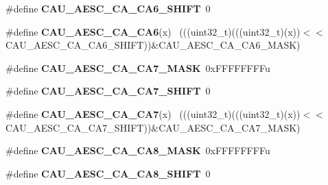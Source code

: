 \begin{DoxyCompactItemize}
\item 
\hypertarget{group___c_a_u___register___masks_gaa8448e0d27851e9f7c9277c78b46909f}{}\#define {\bfseries C\+A\+U\+\_\+\+A\+E\+S\+C\+\_\+\+C\+A\+\_\+\+C\+A6\+\_\+\+S\+H\+I\+F\+T}~0\label{group___c_a_u___register___masks_gaa8448e0d27851e9f7c9277c78b46909f}

\item 
\hypertarget{group___c_a_u___register___masks_ga6980b78417b9dc96778706bfc75820b6}{}\#define {\bfseries C\+A\+U\+\_\+\+A\+E\+S\+C\+\_\+\+C\+A\+\_\+\+C\+A6}(x)                                          ~(((uint32\+\_\+t)(((uint32\+\_\+t)(x))$<$$<$C\+A\+U\+\_\+\+A\+E\+S\+C\+\_\+\+C\+A\+\_\+\+C\+A6\+\_\+\+S\+H\+I\+F\+T))\&C\+A\+U\+\_\+\+A\+E\+S\+C\+\_\+\+C\+A\+\_\+\+C\+A6\+\_\+\+M\+A\+S\+K)\label{group___c_a_u___register___masks_ga6980b78417b9dc96778706bfc75820b6}

\item 
\hypertarget{group___c_a_u___register___masks_ga52597534749f65beb43a15fc74aafb0e}{}\#define {\bfseries C\+A\+U\+\_\+\+A\+E\+S\+C\+\_\+\+C\+A\+\_\+\+C\+A7\+\_\+\+M\+A\+S\+K}~0x\+F\+F\+F\+F\+F\+F\+F\+Fu\label{group___c_a_u___register___masks_ga52597534749f65beb43a15fc74aafb0e}

\item 
\hypertarget{group___c_a_u___register___masks_gaf1760cda5d2b0930cef17ec6966d81c1}{}\#define {\bfseries C\+A\+U\+\_\+\+A\+E\+S\+C\+\_\+\+C\+A\+\_\+\+C\+A7\+\_\+\+S\+H\+I\+F\+T}~0\label{group___c_a_u___register___masks_gaf1760cda5d2b0930cef17ec6966d81c1}

\item 
\hypertarget{group___c_a_u___register___masks_gabeced67c3c234d638e67bb3fd5b45122}{}\#define {\bfseries C\+A\+U\+\_\+\+A\+E\+S\+C\+\_\+\+C\+A\+\_\+\+C\+A7}(x)                                          ~(((uint32\+\_\+t)(((uint32\+\_\+t)(x))$<$$<$C\+A\+U\+\_\+\+A\+E\+S\+C\+\_\+\+C\+A\+\_\+\+C\+A7\+\_\+\+S\+H\+I\+F\+T))\&C\+A\+U\+\_\+\+A\+E\+S\+C\+\_\+\+C\+A\+\_\+\+C\+A7\+\_\+\+M\+A\+S\+K)\label{group___c_a_u___register___masks_gabeced67c3c234d638e67bb3fd5b45122}

\item 
\hypertarget{group___c_a_u___register___masks_ga7d4416b298869da3e7c79f6a3443f015}{}\#define {\bfseries C\+A\+U\+\_\+\+A\+E\+S\+C\+\_\+\+C\+A\+\_\+\+C\+A8\+\_\+\+M\+A\+S\+K}~0x\+F\+F\+F\+F\+F\+F\+F\+Fu\label{group___c_a_u___register___masks_ga7d4416b298869da3e7c79f6a3443f015}

\item 
\hypertarget{group___c_a_u___register___masks_ga6498c3198edfe7b02dee8cb187511abb}{}\#define {\bfseries C\+A\+U\+\_\+\+A\+E\+S\+C\+\_\+\+C\+A\+\_\+\+C\+A8\+\_\+\+S\+H\+I\+F\+T}~0\label{group___c_a_u___register___masks_ga6498c3198edfe7b02dee8cb187511abb}


\end{DoxyCompactItemize}
